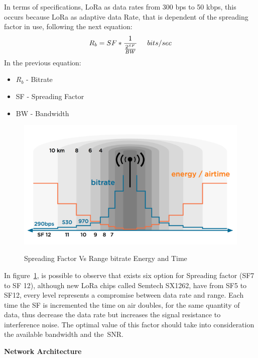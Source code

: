 In terms of specifications, LoRa as data rates from 300 bps to 50 kbps, this occurs because LoRa as adaptive data Rate, that is dependent of the spreading factor in use, following the next equation:
\begin{equation}
    \label{eq:Modulation_Bit_Rate}
        R_b = SF *  \frac{1}{\frac{2^{SF}}{BW}}\hspace{5mm} bits/sec
\end{equation}
In the previous equation:
\begin{itemize}
	\item {$R_b$} - Bitrate
	\item SF - Spreading Factor 
	\item  BW - Bandwidth

\end{itemize} 
\begin{figure}[htbp]
  \centering
    {\includegraphics[width=0.5\linewidth]{Chapters/Figures/LoRa-bitrate-timeonair-04-01.png}}%
  \caption{Spreading Factor Vs Range bitrate Energy and Time }
  \label{fig:lora_sf}
\end{figure}

In figure~\ref{fig:lora_sf}, is possible to observe that exists six option for Spreading factor (SF7 to SF 12), although new LoRa chips called Semtech SX1262, have from SF5 to SF12, every level represents a compromise between data rate and range. Each time the SF is incremented the time on air doubles, for the same quantity of data, thus decrease the data rate but increases the signal resistance to interference noise. The optimal value of this factor should take into consideration the available bandwidth and the~\gls{SNR}.

\textbf{Network Architecture}

